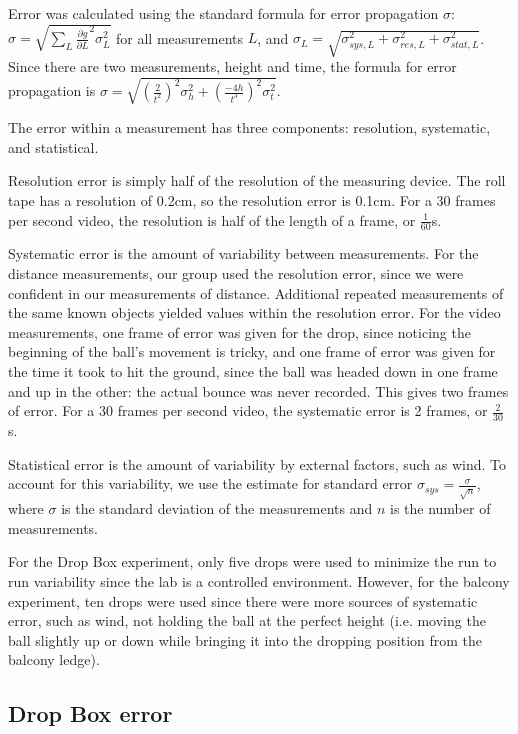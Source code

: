 \documentclass[12pt]{article}
\begin{document}
Error was calculated using the standard formula for error propagation \(\sigma\): \(\sigma = \sqrt{\sum_{L} \frac{\partial g}{\partial L}^{2}\sigma_{L}^{2}}\) for all measurements \(L\), and \(\sigma_{L}=\sqrt{\sigma_{sys,L}^{2}+\sigma_{res,L}^{2}+\sigma_{stat,L}^{2}}\). Since there are two measurements, height and time, the formula for error propagation is \(\sigma = \sqrt{ \left( \frac{2}{t^{2}} \right) ^{2} \sigma_{h}^{2} + \left( \frac{-4h}{t^{3}} \right)^{2}\sigma_{t}^{2} }\).

The error within a measurement has three components: resolution, systematic, and statistical.

Resolution error is simply half of the resolution of the measuring device. The roll tape has a resolution of 0.2cm, so the resolution error is 0.1cm. For a 30 frames per second video, the resolution is half of the length of a frame, or \(\frac{1}{60}\)s.

Systematic error is the amount of variability between measurements. For the distance measurements, our group used the resolution error, since we were confident in our measurements of distance. Additional repeated measurements of the same known objects yielded values within the resolution error. For the video measurements, one frame of error was given for the drop, since noticing the beginning of the ball's movement is tricky, and one frame of error was given for the time it took to hit the ground, since the ball was headed down in one frame and up in the other: the actual bounce was never recorded. This gives two frames of error. For a 30 frames per second video, the systematic error is 2 frames, or \(\frac{2}{30}\)s.

Statistical error is the amount of variability by external factors, such as wind. To account for this variability, we use the estimate for standard error \(\sigma_{sys} = \frac{\sigma}{\sqrt{n}}\), where \(\sigma\) is the standard deviation of the measurements and \(n\) is the number of measurements.

For the Drop Box experiment, only five drops were used to minimize the run to run variability since the lab is a controlled environment. However, for the balcony experiment, ten drops were used since there were more sources of systematic error, such as wind, not holding the ball at the perfect height (i.e. moving the ball slightly up or down while bringing it into the dropping position from the balcony ledge).
\subsection{Drop Box error}
\label{sec:org5f05db6}
\end{document}
